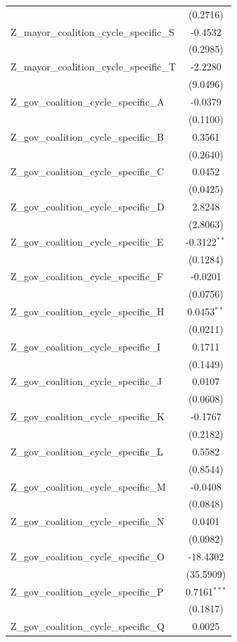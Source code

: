 \begin{tabular}{lc}
 & (0.2716) \\
Z\_mayor\_coalition\_cycle\_specific\_S & -0.4532 \\
 & (0.2985) \\
Z\_mayor\_coalition\_cycle\_specific\_T & -2.2280 \\
 & (9.0496) \\
Z\_gov\_coalition\_cycle\_specific\_A & -0.0379 \\
 & (0.1100) \\
Z\_gov\_coalition\_cycle\_specific\_B & 0.3561 \\
 & (0.2640) \\
Z\_gov\_coalition\_cycle\_specific\_C & 0.0452 \\
 & (0.0425) \\
Z\_gov\_coalition\_cycle\_specific\_D & 2.8248 \\
 & (2.8063) \\
Z\_gov\_coalition\_cycle\_specific\_E & -0.3122$^{**}$ \\
 & (0.1284) \\
Z\_gov\_coalition\_cycle\_specific\_F & -0.0201 \\
 & (0.0756) \\
Z\_gov\_coalition\_cycle\_specific\_H & 0.0453$^{**}$ \\
 & (0.0211) \\
Z\_gov\_coalition\_cycle\_specific\_I & 0.1711 \\
 & (0.1449) \\
Z\_gov\_coalition\_cycle\_specific\_J & 0.0107 \\
 & (0.0608) \\
Z\_gov\_coalition\_cycle\_specific\_K & -0.1767 \\
 & (0.2182) \\
Z\_gov\_coalition\_cycle\_specific\_L & 0.5582 \\
 & (0.8544) \\
Z\_gov\_coalition\_cycle\_specific\_M & -0.0408 \\
 & (0.0848) \\
Z\_gov\_coalition\_cycle\_specific\_N & 0.0401 \\
 & (0.0982) \\
Z\_gov\_coalition\_cycle\_specific\_O & -18.4302 \\
 & (35.5909) \\
Z\_gov\_coalition\_cycle\_specific\_P & 0.7161$^{***}$ \\
 & (0.1817) \\
Z\_gov\_coalition\_cycle\_specific\_Q & 0.0025 \\

\end{tabular}
